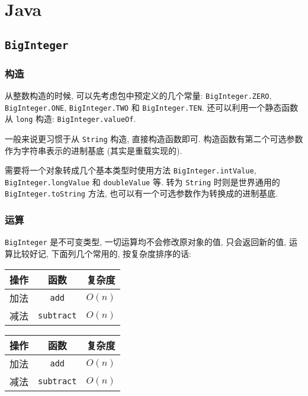 \section{Java} \subsection{\lstinline[basicstyle=\mono]{BigInteger}}
\subsubsection{构造}
从整数构造的时候, 可以先考虑包中预定义的几个常量: \lstinline{BigInteger.ZERO}, \lstinline{BigInteger.ONE}, \lstinline{BigInteger.TWO} 和 \lstinline{BigInteger.TEN}. 还可以利用一个静态函数从 \lstinline{long} 构造: \lstinline{BigInteger.valueOf}.

一般来说更习惯于从 \lstinline{String} 构造, 直接构造函数即可. 构造函数有第二个可选参数作为字符串表示的进制基底 (其实是重载实现的).

需要将一个对象转成几个基本类型时使用方法 \lstinline{BigInteger.intValue}, \lstinline{BigInteger.longValue} 和 \lstinline{doubleValue} 等. 转为 \lstinline{String} 时则是世界通用的 \lstinline{BigInteger.toString} 方法, 也可以有一个可选参数作为转换成的进制基底.

\subsubsection{运算}
\lstinline{BigInteger} 是不可变类型, 一切运算均不会修改原对象的值, 只会返回新的值, 运算比较好记, 下面列几个常用的, 按复杂度排序的话:

\begin{center}
  \begin{tabular}{ccc}
    \toprule
    操作 & 函数 & 复杂度 \\
    \toprule
    加法 & \lstinline|add| & $O(n)$ \\
    \midrule
    减法 & \lstinline|subtract| & $O(n)$ \\
    \bottomrule
  \end{tabular}\qquad
  \begin{tabular}{ccc}
    \toprule
    操作 & 函数 & 复杂度 \\
    \toprule
    加法 & \lstinline|add| & $O(n)$ \\
    \midrule
    减法 & \lstinline|subtract| & $O(n)$ \\
    \bottomrule
  \end{tabular}
\end{center}

